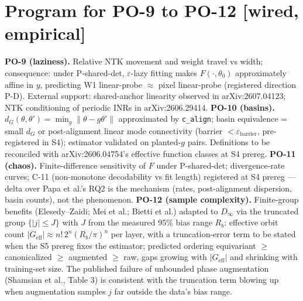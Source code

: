 \documentclass[11pt]{article}
\begin{document}
\section{Program for PO-9 to PO-12 [wired, empirical]}
\textbf{PO-9 (laziness).} Relative NTK movement and weight travel vs width; consequence: under
P-shared-det, $\varepsilon$-lazy fitting makes $F(\cdot,\theta_0)$ approximately affine in $y$,
predicting W1 linear-probe $\approx$ pixel linear-probe (registered direction P-D). External
support: shared-anchor linearity observed in arXiv:2607.04123; NTK conditioning of periodic INRs
in arXiv:2606.29414.
\textbf{PO-10 (basins).} $d_G(\theta,\theta')=\min_g\|\theta-g\theta'\|$ approximated by
\texttt{c\_align}; basin equivalence = small $d_G$ or post-alignment linear mode connectivity
(barrier $<\varepsilon_{\mathrm{barrier}}$, pre-registered in S4); estimator validated on
planted-$g$ pairs. Definitions to be reconciled with arXiv:2606.04754's effective function
classes at S4 prereg.
\textbf{PO-11 (chaos).} Finite-difference sensitivity of $F$ under P-shared-det; divergence-rate
curves; C-11 (non-monotone decodability vs fit length) registered at S4 prereg — delta over Papa
et al.'s RQ2 is the mechanism (rates, post-alignment dispersion, basin counts), not the phenomenon.
\textbf{PO-12 (sample complexity).} Finite-group benefits (Elesedy--Zaidi; Mei et al.; Bietti et
al.) adapted to $D_\infty$ via the truncated group $\{|j|\le J\}$ with $J$ from the measured 95\%
bias range $R_b$: effective orbit count $|G_{\mathrm{eff}}|\approx n!\,2^n(R_b/\pi)^n$ per layer,
with a truncation-error term to be stated when the S5 prereg fixes the estimator; predicted
ordering equivariant $\ge$ canonicalized $\ge$ augmented $\ge$ raw, gaps growing with
$|G_{\mathrm{eff}}|$ and shrinking with training-set size. The published failure of unbounded
phase augmentation (Shamsian et al., Table 3) is consistent with the truncation term blowing up
when augmentation samples $j$ far outside the data's bias range.
\end{document}
